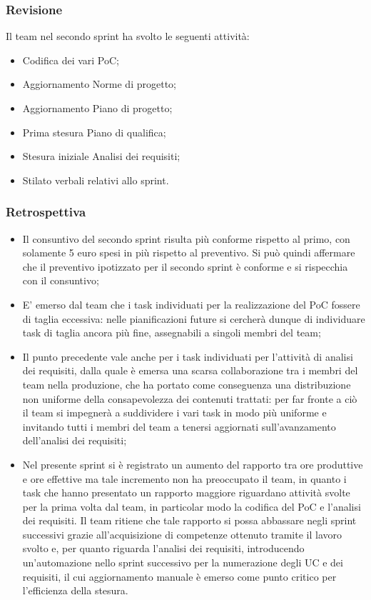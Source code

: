 \documentclass[10pt, a4paper]{article}
\begin{document}
\subsubsection{Revisione}
Il team nel secondo sprint ha svolto le seguenti attività:
\begin{itemize}
    \item Codifica dei vari PoC;
    \item Aggiornamento Norme di progetto;
    \item Aggiornamento Piano di progetto;
    \item Prima stesura Piano di qualifica;
    \item Stesura iniziale Analisi dei requisiti;
    \item Stilato verbali relativi allo sprint.
\end{itemize}
\subsubsection{Retrospettiva}
\begin{itemize}
    \item Il consuntivo del secondo sprint risulta più conforme rispetto al primo, con solamente 5 euro spesi in più rispetto al preventivo. 
    Si può quindi affermare che il preventivo ipotizzato per il secondo sprint è conforme e si rispecchia con il consuntivo;
    \item E' emerso dal team che i task individuati per la realizzazione del PoC fossere di taglia eccessiva: nelle pianificazioni future si cercherà
    dunque di individuare task di taglia ancora più fine, assegnabili a singoli membri del team;
    \item Il punto precedente vale anche per i task individuati per l'attività di analisi dei requisiti, dalla quale è emersa una scarsa collaborazione
    tra i membri del team nella produzione, che ha portato come conseguenza una distribuzione non uniforme della consapevolezza dei contenuti trattati: per 
    far fronte a ciò il team si impegnerà a suddividere i vari task in modo più uniforme e invitando tutti i membri del team a tenersi aggiornati 
    sull'avanzamento dell'analisi dei requisiti;
    \item Nel presente sprint si è registrato un aumento del rapporto tra ore produttive e ore effettive ma tale incremento non ha preoccupato il team, 
    in quanto i task che hanno presentato un rapporto maggiore riguardano attività svolte per la prima volta dal team, in particolar modo la codifica del PoC
    e l'analisi dei requisiti. Il team ritiene che tale rapporto si possa abbassare negli sprint successivi grazie all'acquisizione di competenze ottenuto tramite
    il lavoro svolto e, per quanto riguarda l'analisi dei requisiti, introducendo un'automazione nello sprint successivo per la numerazione degli UC e dei requisiti, 
    il cui aggiornamento manuale è emerso come punto critico per l'efficienza della stesura.
\end{itemize}
\end{document}

